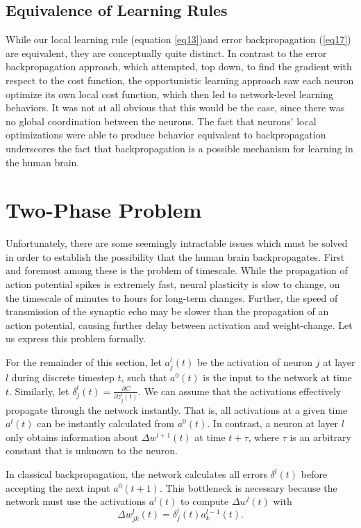 \documentclass[12pt]{article}
\newcommand{\partialderiv}[2]{\frac{\partial #1}{\partial #2}}
\begin{document}
\subsection{Equivalence of Learning Rules}
While our local learning rule (equation \ref{eq13})and error backpropagation (\ref{eq17}) are equivalent, they are conceptually quite distinct. In contrast to the error backpropagation approach, which attempted, top down, to find the gradient with respect to the cost function, the opportunistic learning approach saw each neuron optimize its own local cost function, which then led to network-level learning behaviors. It was not at all obvious that this would be the case, since there was no global coordination between the neurons. The fact that neurons' local optimizations were able to produce behavior equivalent to backpropagation underscores the fact that backpropagation is a possible mechanism for learning in the human brain.

\section{Two-Phase Problem}
Unfortunately, there are some seemingly intractable issues which must be solved in order to establish the possibility that the human brain backpropagates. First and foremost among these is the problem of timescale. While the propagation of action potential spikes is extremely fast, neural plasticity is slow to change, on the timescale of minutes to hours for long-term changes. \cite{Wei2021} Further, the speed of transmission of the synaptic echo may be slower than the propagation of an action potential, causing further delay between activation and weight-change. Let us express this problem formally.

For the remainder of this section, let $a_j^l(t)$ be the activation of neuron $j$ at layer $l$ during discrete timestep $t$, such that $a^0(t)$ is the input to the network at time $t$. Similarly, let $\delta^l_j(t) = \partialderiv{C}{z_j^l(t)}$. We can assume that the activations effectively propagate through the network instantly. That is, all activations at a given time $a^l(t)$ can be instantly calculated from $a^0(t)$. In contrast, a neuron at layer $l$ only obtains information about $\Delta w^{l+1}(t)$ at time $t + \tau$, where $\tau$ is an arbitrary constant that is unknown to the neuron.

In classical backpropagation, the network calculates all errors $\delta^l(t)$ before accepting the next input $a^0(t+1)$. This bottleneck is necessary because the network must use the activations $a^l(t)$ to compute $\Delta w^l(t)$ with
\begin{equation}
	\Delta w_{jk}^l(t) = \delta^l_j(t)a_k^{l-1}(t).
\end{equation}
\end{document}
